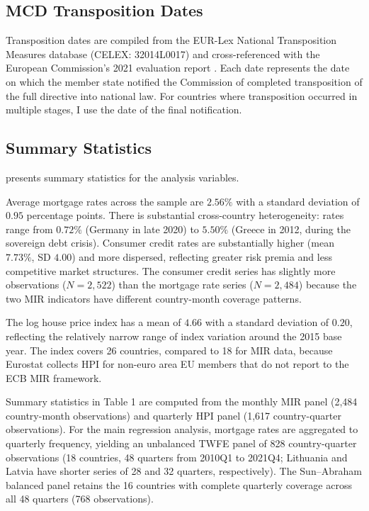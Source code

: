 \documentclass[12pt]{article}
\begin{document}
\subsection{MCD Transposition Dates}

Transposition dates are compiled from the EUR-Lex National Transposition Measures database (CELEX: 32014L0017) and cross-referenced with the European Commission's 2021 evaluation report \citep{european_commission_2021_eval}. Each date represents the date on which the member state notified the Commission of completed transposition of the full directive into national law. For countries where transposition occurred in multiple stages, I use the date of the final notification.

\subsection{Summary Statistics}

 presents summary statistics for the analysis variables.



Average mortgage rates across the sample are $2.56\%$ with a standard deviation of $0.95$ percentage points. There is substantial cross-country heterogeneity: rates range from $0.72\%$ (Germany in late 2020) to $5.50\%$ (Greece in 2012, during the sovereign debt crisis). Consumer credit rates are substantially higher (mean $7.73\%$, SD $4.00$) and more dispersed, reflecting greater risk premia and less competitive market structures. The consumer credit series has slightly more observations ($N = 2{,}522$) than the mortgage rate series ($N = 2{,}484$) because the two MIR indicators have different country-month coverage patterns.

The log house price index has a mean of $4.66$ with a standard deviation of $0.20$, reflecting the relatively narrow range of index variation around the 2015 base year. The index covers 26 countries, compared to 18 for MIR data, because Eurostat collects HPI for non-euro area EU members that do not report to the ECB MIR framework.

Summary statistics in Table 1 are computed from the monthly MIR panel (2,484 country-month observations) and quarterly HPI panel (1,617 country-quarter observations). For the main regression analysis, mortgage rates are aggregated to quarterly frequency, yielding an unbalanced TWFE panel of 828 country-quarter observations (18 countries, 48 quarters from 2010Q1 to 2021Q4; Lithuania and Latvia have shorter series of 28 and 32 quarters, respectively). The Sun--Abraham balanced panel retains the 16 countries with complete quarterly coverage across all 48 quarters (768 observations).
\end{document}
